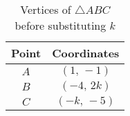 \begin{table}[h!]
    \centering
    \begin{tabular}{|c|c|}
        \hline
        Point & Coordinates \\
        \hline
        $A$ & $(1,\,-1)$ \\
        $B$ & $(-4,\,2k)$ \\
        $C$ & $(-k,\,-5)$ \\
        \hline
    \end{tabular}
    \caption{Vertices of $\triangle ABC$ before substituting $k$}
    \label{tab:triangle_k}
\end{table}
